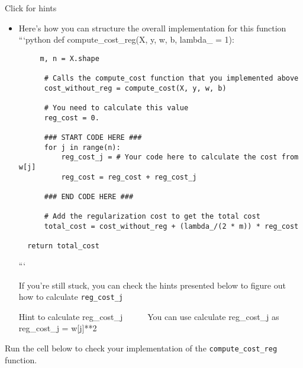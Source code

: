 \documentclass[11pt]{article}
\begin{document}
    Click for hints

\begin{itemize}
\item
  Here's how you can structure the overall implementation for this
  function ```python def compute\_cost\_reg(X, y, w, b, lambda\_ = 1):

\begin{verbatim}
     m, n = X.shape

      # Calls the compute_cost function that you implemented above
      cost_without_reg = compute_cost(X, y, w, b) 

      # You need to calculate this value
      reg_cost = 0.

      ### START CODE HERE ###
      for j in range(n):
          reg_cost_j = # Your code here to calculate the cost from w[j]
          reg_cost = reg_cost + reg_cost_j

      ### END CODE HERE ### 

      # Add the regularization cost to get the total cost
      total_cost = cost_without_reg + (lambda_/(2 * m)) * reg_cost

  return total_cost
\end{verbatim}

  ```

  If you're still stuck, you can check the hints presented below to
  figure out how to calculate \texttt{reg\_cost\_j}

  Hint to calculate reg\_cost\_j     You can use calculate reg\_cost\_j
  as reg\_cost\_j = w{[}j{]}**2
\end{itemize}

    Run the cell below to check your implementation of the
\texttt{compute\_cost\_reg} function.
\end{document}
